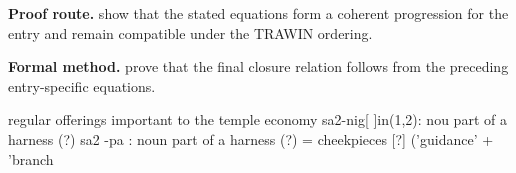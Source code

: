 \textbf{Proof route.} show that the stated equations form a coherent progression for the entry and remain compatible under the TRAWIN ordering.

\textbf{Formal method.} prove that the final closure relation follows from the preceding entry-specific equations.

\medskip
{}

\begin{tzpsnapshot}
\end{tzpsnapshot}

\tzpequationlinks
  {regular offerings important to the temple economy sa2-nig[ ]in(1,2): nou}
  {part of a harness (?) sa2 -pa : noun}
  {part of a harness (?) = cheekpieces [?] ('guidance' + 'branch}
